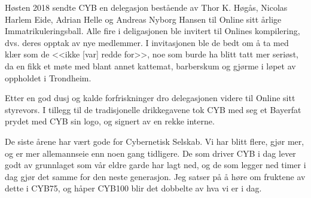 Høsten 2018 sendte CYB en delegasjon bestående av Thor K. Høgås, Nicolas Harlem Eide, Adrian Helle og Andreas Nyborg Hansen til Online sitt årlige Immatrikuleringsball. Alle fire i deligasjonen ble invitert til Onlines kompilering, dvs. deres opptak av nye medlemmer. I invitasjonen ble de bedt om å ta med klær som de <<ikke [var] redde for>>, noe som burde ha blitt tatt mer seriøst, da en fikk et møte med blant annet kattemat, barberskum og gjørme i løpet av oppholdet i Trondheim. 

Etter en god dusj og kalde forfriskninger dro delegasjonen videre til Online sitt styrevors. I tillegg til de tradisjonelle drikkegavene tok CYB med seg et Bayerfat prydet med CYB sin logo, og signert av en rekke interne. 

De siste årene har vært gode for Cybernetisk Selskab. Vi har blitt flere, gjør mer, og er mer allemannseie enn noen gang tidligere. De som driver CYB i dag lever godt av grunnlaget som vår eldre garde har lagt ned, og de som legger ned timer i dag gjør det samme for den neste generasjon. Jeg satser på å høre om fruktene av dette i CYB75, og håper CYB100 blir det dobbelte av hva vi er i dag. 
